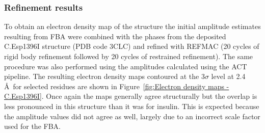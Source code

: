 \subsubsection{Refinement results}
\label{subs:Refinement results - C.Esp1396I}
To obtain an electron density map of the structure the initial amplitude estimates resulting from FBA were combined with the phases from the deposited C.Esp1396I structure (PDB code 3CLC) and refined with REFMAC \cite{murshudov2011refmac5} (20 cycles of rigid body refinement followed by 20 cycles of restrained refinement).
The same procedure was also performed using the amplitudes calculated using the ACT pipeline.
The resulting electron density maps contoured at the 3$\sigma$ level at 2.4$\,$\AA\ for selected residues are shown in Figure~\ref{fig:Electron density maps - C.Esp1396I}.
Once again the maps generally agree structurally but the overlap is less pronounced in this structure than it was for insulin.
This is expected because the amplitude values did not agree as well, largely due to an incorrect scale factor used for the FBA.
